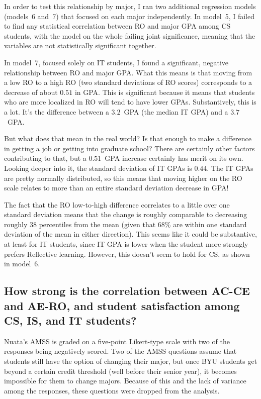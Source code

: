 In order to test this relationship by major, I ran two additional regression models (models~6 and~7) that focused on each major independently. In model~5, I failed to find any statistical correlation between RO and major GPA among CS students, with the model on the whole failing joint significance, meaning that the variables are not statistically significant together.

In model~7, focused solely on IT students, I found a significant, negative relationship between RO and major GPA. What this means is that moving from a low RO to a high RO (two standard deviations of RO scores) corresponds to a decrease of about $0.51$ in GPA. This is significant because it means that students who are more localized in RO will tend to have lower GPAs. Substantively, this is a lot. It's the difference between a $3.2$~GPA (the median IT GPA) and a $3.7$~GPA.

But what does that mean in the real world? Is that enough to make a difference in getting a job or getting into graduate school? There are certainly other factors contributing to that, but a $0.51$~GPA increase certainly has merit on its own. Looking deeper into it, the standard deviation of IT GPAs is $0.44$. The IT GPAs are pretty normally distributed, so this means that moving higher on the RO scale relates to more than an entire standard deviation decrease in GPA!

The fact that the RO low-to-high difference correlates to a little over one standard deviation means that the change is roughly comparable to decreasing roughly 38 percentiles from the mean (given that 68\% are within one standard deviation of the mean in either direction). This seems like it could be substantive, at least for IT students, since IT GPA is lower when the student more strongly prefers Reflective learning. However, this doesn't seem to hold for CS, as shown in model~6.

\subsection{How strong is the correlation between AC-CE and AE-RO, and student satisfaction among CS, IS, and IT students?}
Nuata's AMSS is graded on a five-point Likert-type scale with two of the responses being negatively scored. Two of the AMSS questions assume that students still have the option of changing their major, but once BYU students get beyond a certain credit threshold (well before their senior year), it becomes impossible for them to change majors. Because of this and the lack of variance among the responses, these questions were dropped from the analysis.

